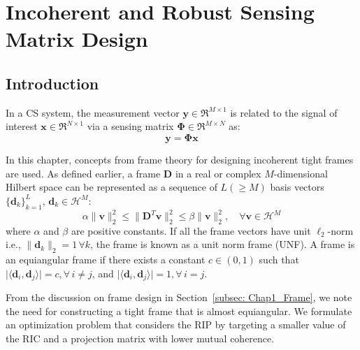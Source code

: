 \chapter{Incoherent and Robust Sensing Matrix Design}
\label{chap:chap4}
%
\section{Introduction}
%
In a CS system, the measurement vector $\bm{y} \in \Re^{M \times 1}$ is related to the signal of interest $\bm{x} \in \Re^{N \times 1}$ via a sensing matrix $\bm{\Phi} \in \Re^{M \times N}$ as:
\begin{equation}
\label{eq:projections_3}
     \bm{y} = \bm{\Phi}\bm{x}
\end{equation}

In this chapter, concepts from frame theory for designing incoherent tight frames are used. As defined earlier, a frame $\bm{D}$ in a real or complex $M$-dimensional Hilbert space can be represented as a sequence of $L \left(\geq M\right)$ basis vectors $\{\bm{d}_{k}\}_{k = 1}^{L}$, $\bm{d}_{k} \in \mathcal{H}^{M}$:
\begin{equation}
\label{eq:parseval_3}
 \alpha\|\bm{v}\|^{2}_{2}\leq \|\bm{D}^{T}\bm{v}\|_{2}^{2} \leq\beta\|\bm{v}\|^{2}_{2},\quad \forall\bm{v}\in\mathcal{H}^{M}
\end{equation}
where $\alpha$ and $\beta$ are positive constants. If all the frame vectors have unit $\ell_{2}$-norm i.e., $\|\bm{d}_{k}\|_{2} = 1 \, \forall k$, the frame is known as a unit norm frame (UNF). A frame is an equiangular frame if there exists a constant $c \in (0,1)$ such that $\lvert\langle \bm{d}_{i},\bm{d}_{j}\rangle\rvert = c, \forall\, i \neq j$, and $\lvert\langle \bm{d}_{i},\bm{d}_{j}\rangle\rvert = 1, \forall\, i = j$.

From the discussion on frame design in Section~\ref{subsec: Chap1_Frame}, we note the need for constructing a tight frame that is almost equiangular. We formulate an optimization problem that considers the RIP by targeting a smaller value of the RIC and a projection matrix with lower mutual coherence.

